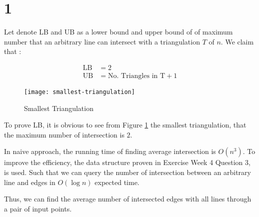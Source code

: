 
\section*{1}

Let denote LB and UB as a lower bound and upper bound of
of maximum number that an arbitrary line can intersect with a
triangulation $T$ of $n$. We claim that :

\begin{align*}
    \mathrm{LB} &= 2\\
    \mathrm{UB} &= \text{No. Triangles in T} + 1
\end{align*}
\begin{figure}[h]
    \begin{center}
        \texttt{[image: smallest-triangulation]}
        \caption{Smallest Triangulation}
        \label{fig:smallest-triangulation}
    \end{center}
\end{figure}

To prove LB, it is obvious to see from Figure \ref{fig:smallest-triangulation}
the smallest triangulation, that the maximum number of intersection is $2$.


In naive approach, the running time of finding average intersection is $O(n^3)$.
To improve the efficiency, the data structure proven in Exercise Week 4 Question 3,
is used. Such that we can query the number of intersection between an arbitrary line and
edges in $O(\log{n})$ expected time.

Thus, we can find the average number of intersected edges with all lines through
a pair of input points.
